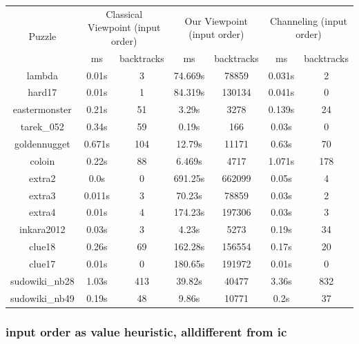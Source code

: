 \documentclass{report}
\begin{document}
\begin{table}[h!]
  \begin{tabular}{|c|c|c|c|c|c|c|}
    \hline
    \multirow{2}{*}{Puzzle} &
      \multicolumn{2}{L|}{Classical Viewpoint (input order)} &
      \multicolumn{2}{L|}{Our Viewpoint (input order)} &
      \multicolumn{2}{L|}{ Channeling (input order)} \\
    & ms & backtracks & ms & backtracks & ms & backtracks \\
    \hline
lambda & 0.01s & 3 & 74.669s & 78859 & 0.031s & 2\\
hard17 & 0.01s & 1 & 84.319s & 130134 & 0.041s & 0\\
eastermonster & 0.21s & 51 & 3.29s & 3278 & 0.139s & 24\\
tarek\_052 & 0.34s & 59 & 0.19s & 166 & 0.03s & 0\\
goldennugget & 0.671s & 104 & 12.79s & 11171 & 0.63s & 70\\
coloin & 0.22s & 88 & 6.469s & 4717 & 1.071s & 178\\
extra2 & 0.0s & 0 & 691.25s & 662099 & 0.05s & 4\\
extra3 & 0.011s & 3 & 70.23s & 78859 & 0.03s & 2\\
extra4 & 0.01s & 4 & 174.23s & 197306 & 0.03s & 3\\
inkara2012 & 0.03s & 3 & 4.23s & 5273 & 0.19s & 34\\
clue18 & 0.26s & 69 & 162.28s & 156554 & 0.17s & 20\\
clue17 & 0.01s & 0 & 180.65s & 191972 & 0.01s & 0\\
sudowiki\_nb28 & 1.03s & 413 & 39.82s & 40477 & 3.36s & 832\\
sudowiki\_nb49 & 0.19s & 48 & 9.86s & 10771 & 0.2s & 37\\
 \hline
  \end{tabular}
\end{table}

\subsubsection{input order as value heuristic, alldifferent from ic}
\end{document}
